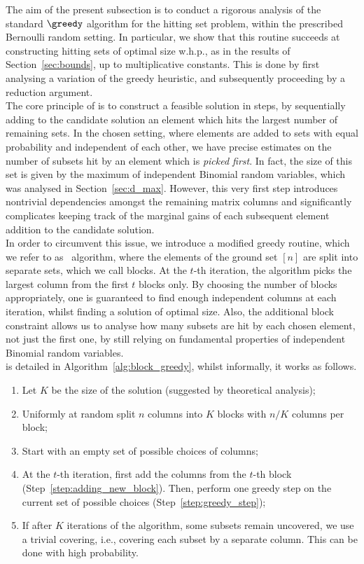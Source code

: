The aim of the present subsection is to conduct a rigorous analysis of the standard $\greedy$ algorithm for the hitting set problem, within the prescribed Bernoulli random setting. In particular, we show that this routine succeeds at constructing hitting sets of optimal size w.h.p., as in the results of Section~\ref{sec:bounds}, up to multiplicative constants. This is done by first analysing a variation of the greedy heuristic, and subsequently proceeding by a reduction argument.\\
\noindent
The core principle of \greedy is to construct a feasible solution in steps, by sequentially adding to the candidate solution an element which hits the largest number of remaining sets. In the chosen setting, where elements are added to sets with equal probability and independent of each other, we have precise estimates on the number of subsets hit by an element which is {\it picked first}. In fact, the size of this set is given by the maximum of independent Binomial random variables, which was analysed in Section~\ref{sec:d_max}. However, this very first step introduces nontrivial dependencies amongst the remaining matrix columns and significantly complicates keeping track of the marginal gains of each subsequent element addition to the candidate solution.\\
\noindent
In order to circumvent this issue, we introduce a modified greedy routine, which we refer to as \bgreedy\ algorithm, where the elements of the ground set $[n]$ are split into separate sets, which we call blocks. At the \(t\)-th iteration, the algorithm picks the largest column from the first $t$ blocks only. By choosing the number of blocks appropriately, one is guaranteed to find enough independent columns at each iteration, whilst finding a solution of optimal size. Also, the additional block constraint allows us to analyse how many subsets are hit by each chosen element, not just the first one, by still relying on fundamental properties of independent Binomial random variables.\\
\noindent
\bgreedy is detailed in Algorithm~\ref{alg:block_greedy}, whilst informally, it works as follows.
\begin{enumerate}
\item Let \(K\) be the size of the solution (suggested by theoretical analysis);
\item Uniformly at random split \(n\) columns into \(K\) blocks with \(n / K\) columns per block;
\item Start with an empty set of possible choices of columns;
\item At the \(t\)-th iteration, first add the columns
from the \(t\)-th block (Step~\ref{step:adding_new_block}).
Then, perform one greedy step on the current
set of possible choices (Step~\ref{step:greedy_step});
\item If after \(K\) iterations of the algorithm, some subsets remain uncovered, we use  a trivial covering, i.e., covering each subset by a separate column. This can be done with high probability.
\end{enumerate}
